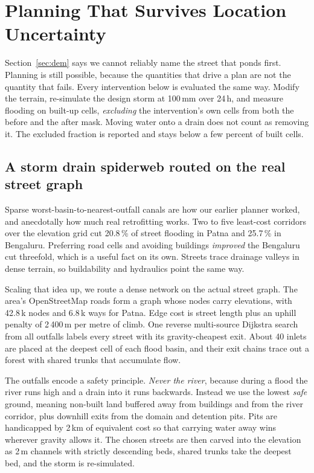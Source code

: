\section{Planning That Survives Location Uncertainty}
\label{sec:planning}

Section~\ref{sec:dem} says we cannot reliably name the street that ponds first. Planning is still
possible, because the quantities that drive a plan are not the quantity that fails. Every
intervention below is evaluated the same way. Modify the terrain, re-simulate the design storm at
100\,mm over 24\,h, and measure flooding on built-up cells, \emph{excluding} the intervention's own
cells from both the before and the after mask. Moving water onto a drain does not count as removing
it. The excluded fraction is reported and stays below a few percent of built cells.

\subsection{A storm drain spiderweb routed on the real street graph}
Sparse worst-basin-to-nearest-outfall canals are how our earlier planner worked, and anecdotally
how much real retrofitting works. Two to five least-cost corridors over the elevation grid cut
20.8\,\% of street flooding in Patna and 25.7\,\% in Bengaluru. Preferring road cells and avoiding
buildings \emph{improved} the Bengaluru cut threefold, which is a useful fact on its own. Streets
trace drainage valleys in dense terrain, so buildability and hydraulics point the same way.

Scaling that idea up, we route a dense network on the actual street graph. The area's
OpenStreetMap roads \cite{osm} form a graph whose nodes carry elevations, with 42.8\,k nodes and
6.8\,k ways for Patna. Edge cost is street length plus an uphill penalty of 2\,400\,m per metre of
climb. One reverse multi-source Dijkstra search from all outfalls labels every street with its
gravity-cheapest exit. About 40 inlets are placed at the deepest cell of each flood basin, and
their exit chains trace out a forest with shared trunks that accumulate flow.

The outfalls encode a safety principle. \emph{Never the river}, because during a flood the river
runs high and a drain into it runs backwards. Instead we use the lowest \emph{safe} ground, meaning
non-built land buffered away from buildings and from the river corridor, plus downhill exits from
the domain and detention pits. Pits are handicapped by 2\,km of equivalent cost so that carrying
water away wins wherever gravity allows it. The chosen streets are then carved into the elevation
as 2\,m channels with strictly descending beds, shared trunks take the deepest bed, and the storm is
re-simulated.

